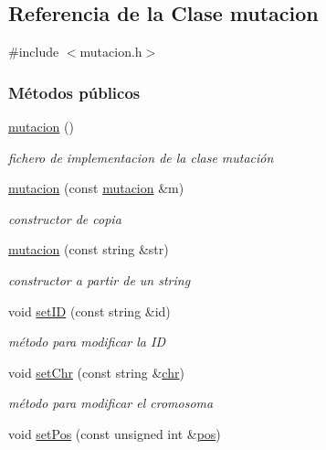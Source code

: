 \hypertarget{classmutacion}{}\subsection{Referencia de la Clase mutacion}
\label{classmutacion}


{\ttfamily \#include $<$mutacion.\+h$>$}

\subsubsection*{Métodos públicos}
\begin{DoxyCompactItemize}
\item 
\hyperlink{classmutacion_a01cb8b2307eacbfb415f99373ff3c64a}{mutacion} ()
\begin{DoxyCompactList}\small\item\em fichero de implementacion de la clase mutación \end{DoxyCompactList}\item 
\hyperlink{classmutacion_a6bcb17c723a359ffac7dda8d5d427dfe}{mutacion} (const \hyperlink{classmutacion}{mutacion} \&m)
\begin{DoxyCompactList}\small\item\em constructor de copia \end{DoxyCompactList}\item 
\hyperlink{classmutacion_a8c5cc5b5146c511b9a1d6976156389c3}{mutacion} (const string \&str)
\begin{DoxyCompactList}\small\item\em constructor a partir de un string \end{DoxyCompactList}\item 
void \hyperlink{classmutacion_af6288453d3cb4e29b8be304ca262b170}{set\+ID} (const string \&id)
\begin{DoxyCompactList}\small\item\em método para modificar la ID \end{DoxyCompactList}\item 
void \hyperlink{classmutacion_a147ee1f35c78ab0b7cf891067bf2e336}{set\+Chr} (const string \&\hyperlink{classmutacion_a57651966b952f782240ff9cff72c5d2f}{chr})
\begin{DoxyCompactList}\small\item\em método para modificar el cromosoma \end{DoxyCompactList}\item 
void \hyperlink{classmutacion_a2667189a28d3ac983a8f63ca92e81fba}{set\+Pos} (const unsigned int \&\hyperlink{classmutacion_ae1487b8648d0eaad68de5e4e5a87f3ff}{pos})

\end{DoxyCompactItemize}
